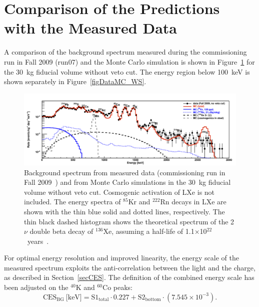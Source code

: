 \section{Comparison of the Predictions with the Measured Data}
\label{secDataMCcomparison}


A comparison of the background spectrum measured during the commissioning run in Fall 2009 (run07) and the Monte Carlo simulation is shown in Figure~\ref{figDataMC_FS} for the 30~kg fiducial volume without veto cut. The energy region below 100~keV is shown separately in Figure~\ref{figDataMC_WS}. 

\begin{figure}[!b]
\centering
\includegraphics[width=1.0\linewidth]{plots/DataMC/dataMC_FS.png}
\caption[Background spectrum measured in the commissioning run in Fall 2009 and Monte Carlo simulations in the 30~kg fiducial volume without veto cut]{Background spectrum from measured data (commissioning run in Fall 2009~\cite{xe100-run07}) and from Monte Carlo simulations in the 30~kg fiducial volume without veto cut. Cosmogenic activation of LXe is not included. The energy spectra of $^{85}$Kr and  $^{222}$Rn decays in LXe are shown with the thin blue solid and dotted lines, respectively. The thin black dashed histogram shows the theoretical spectrum of the 2$\nu$ double beta decay of $^{136}$Xe, assuming a half-life of 1.1$\times$10$^{22}$~years~\cite{DoubleBetaLimit}. }
\label{figDataMC_FS}
\end{figure}

For optimal energy resolution and improved linearity, the energy scale of the measured spectrum exploits the anti-correlation between the light and the charge, as described in Section~\ref{secCES}. The definition of the combined energy scale has been adjusted on the $^{40}$K and $^{60}$Co peaks:
\begin{equation}
\label{eqCES_BG}
\mathrm{CES}_{\mathrm{BG}}\ \text{[keV]} = \mathrm{S}1_{\mathrm{total}} \cdot 0.227 + \mathrm{S}2_{\mathrm{bottom}} \cdot (7.545\times10^{-3}).
\end{equation}

